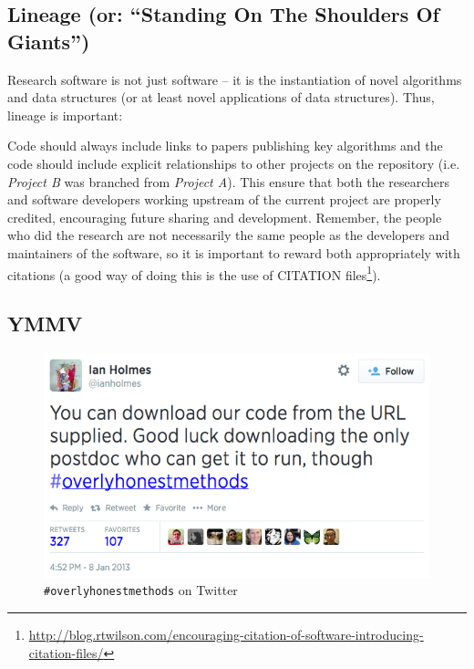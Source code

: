 \documentclass[a4paper,11pt]{article}
\begin{document}
\subsection{Lineage (or: ``Standing On The Shoulders Of Giants'')} 

Research software is not just software -- it is the instantiation of
novel algorithms and data structures (or at least novel applications
of data structures). Thus, lineage is important:

 Code should always
include links to papers publishing key algorithms and the code should
include explicit relationships to other projects on the repository
(i.e. {\emph{Project B}} was branched from {\emph{Project A}}). This
ensure that both the researchers and software developers working
upstream of the current project are properly credited, encouraging
future sharing and development. Remember, the people who did the
research are not necessarily the same people as the developers and
maintainers of the software, so it is important to reward both
appropriately with citations (a good way of doing this is the use of
CITATION
files\footnote{\url{http://blog.rtwilson.com/encouraging-citation-of-software-introducing-citation-files/}}).

\subsection{YMMV}

\begin{figure}[!ht]
\centering
\includegraphics[width=0.9\columnwidth]{overlyhonesttweet.png}
\caption{{\texttt{\#overlyhonestmethods}} on Twitter}
\label{fig:overlyhonestmethod} 
\end{figure}
\end{document}
